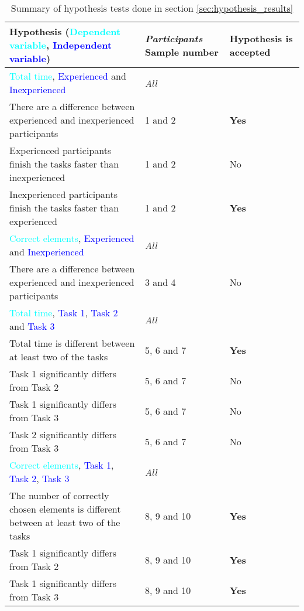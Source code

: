 	\begin{longtable}{p{}|p{}|p{}}  %
	\caption[Summary, hypothesis tests]{Summary of hypothesis tests done in section \ref{sec:hypothesis_results}} \label{tab:hypothesistest_summary} \\
		Hypothesis (\textcolor{cyan}{Dependent variable}, \textcolor{blue}{Independent variable}) & \textit{Participants} Sample number& Hypothesis is accepted \\[0.2cm] \hline
		\textcolor{cyan}{Total time}, \textcolor{blue}{Experienced} and \textcolor{blue}{Inexperienced} & \textit{All} &  \\
		There are a difference between experienced and inexperienced participants & 1 and 2 & \textbf{Yes} \\
		Experienced participants finish the tasks faster than inexperienced  & 1 and 2 & No   \\ 
		Inexperienced participants finish the tasks faster than experienced  & 1 and 2 & \textbf{Yes}   \\ \hline
		\textcolor{cyan}{Correct elements}, \textcolor{blue}{Experienced} and \textcolor{blue}{Inexperienced} & \textit{All} &  \\
		There are a difference between experienced and inexperienced participants & 3 and 4 & No   \\ \hline
		\textcolor{cyan}{Total time}, \textcolor{blue}{Task 1}, \textcolor{blue}{Task 2} and \textcolor{blue}{Task 3}& \textit{All} &  \\
		 Total time is different between at least two of the tasks & 5, 6 and 7 & \textbf{Yes}   \\
		 Task 1 significantly differs from Task 2 & 5, 6 and 7 & No  \\ 
		 Task 1 significantly differs from Task 3 & 5, 6 and 7 & No  \\ 
		 Task 2 significantly differs from Task 3 & 5, 6 and 7 & No  \\ \hline
		\textcolor{cyan}{Correct elements}, \textcolor{blue}{Task 1}, \textcolor{blue}{Task 2}, \textcolor{blue}{Task 3} & \textit{All} &  \\
		The number of correctly chosen elements is different between at least two of the tasks & 8, 9 and 10 & \textbf{Yes}  \\
		Task 1 significantly differs from Task 2 & 8, 9 and 10 & \textbf{Yes}  \\ 
		Task 1 significantly differs from Task 3 & 8, 9 and 10 & \textbf{Yes}  \\ 

\end{longtable}
